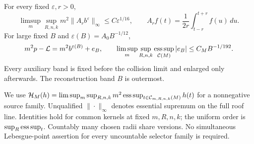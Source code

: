 \begin{inputstatement}
\label{input:v94-scalar}
For every fixed $\varepsilon,r>0$,
\begin{equation}\label{eq:v94-average-input}
 \limsup_m\sup_{R,n,k}m^2\|A_rb^\varepsilon\|_\infty
       \le C\varepsilon^{1/16},\qquad
 A_rf(t)=\frac1{2r}\int_{t-r}^{t+r}f(u)\,du.
\end{equation}
For large fixed $B$ and $\varepsilon(B)=A_0B^{-1/12}$,
\begin{equation}\label{eq:v94-remainder}
 m^2p-\mathcal L=m^2b^{\varepsilon(B)}+e_B,
 \qquad \limsup_m\sup_{R,n,k}\esssup_{\mathcal C(M)}|e_B|
                                      \le C_MB^{-1/192}.
\end{equation}
Every auxiliary band is fixed before the collision limit and enlarged
only afterwards. The reconstruction band $B$ is outermost.
\end{inputstatement}
We use $\mathcal H_M(h)=\limsup_m\sup_{R,n,k}m^2
\operatorname*{ess\,sup}_{t\in\mathcal C_{m,R,n,k}(M)}h(t)$ for a nonnegative source
family. Unqualified $\|\cdot\|_\infty$ denotes essential supremum
on the full roof line. Identities hold for common kernels at fixed
$m,R,n,k$; the uniform order is $\sup_R\operatorname*{ess\,sup}_t$. Countably many
chosen radii share versions. No simultaneous Lebesgue-point assertion
for every uncountable selector family is required.
